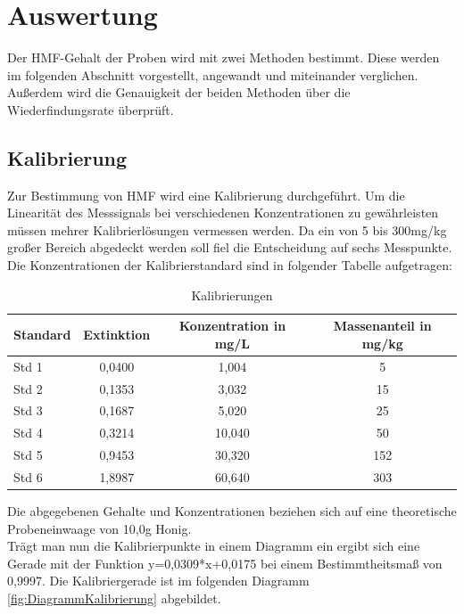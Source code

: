 \chapter{Auswertung}
Der HMF-Gehalt der Proben wird mit zwei Methoden bestimmt. Diese werden im folgenden Abschnitt vorgestellt, angewandt und miteinander verglichen. Außerdem wird die Genauigkeit der beiden Methoden über die Wiederfindungsrate überprüft.
\section{Kalibrierung}
Zur Bestimmung von HMF wird eine Kalibrierung durchgeführt. Um die Linearität des Messsignals bei verschiedenen Konzentrationen zu gewährleisten müssen mehrer Kalibrierlösungen vermessen werden. Da ein von 5 bis 300mg/kg großer Bereich abgedeckt werden soll fiel die Entscheidung auf sechs Messpunkte. Die Konzentrationen der Kalibrierstandard sind in folgender Tabelle aufgetragen:

\begin{table}[htbp]
	\centering
	\caption{Kalibrierungen}
		\begin{tabular}{l|c|c|c}
			Standard & Extinktion & Konzentration in mg/L &  Massenanteil in mg/kg\\
			\hline
			Std 1 & 0,0400 & 1,004 & 5\\
			\hline
			Std 2 & 0,1353 & 3,032 & 15\\
			\hline
			Std 3 & 0,1687 & 5,020 & 25\\
			\hline
			Std 4 & 0,3214 & 10,040 & 50\\
			\hline
			Std 5 & 0,9453 & 30,320 & 152\\
			\hline
			Std 6 & 1,8987 & 60,640 & 303
		\end{tabular}
		\label{tab:Kalibrierungen}
\end{table}

Die abgegebenen Gehalte und Konzentrationen beziehen sich auf eine theoretische Probeneinwaage von 10,0g Honig.\\
Trägt man nun die Kalibrierpunkte in einem Diagramm ein ergibt sich eine Gerade mit der Funktion y=0,0309*x+0,0175 bei einem Bestimmtheitsmaß von 0,9997. Die Kalibriergerade ist im folgenden Diagramm \ref{fig:DiagrammKalibrierung} abgebildet.

